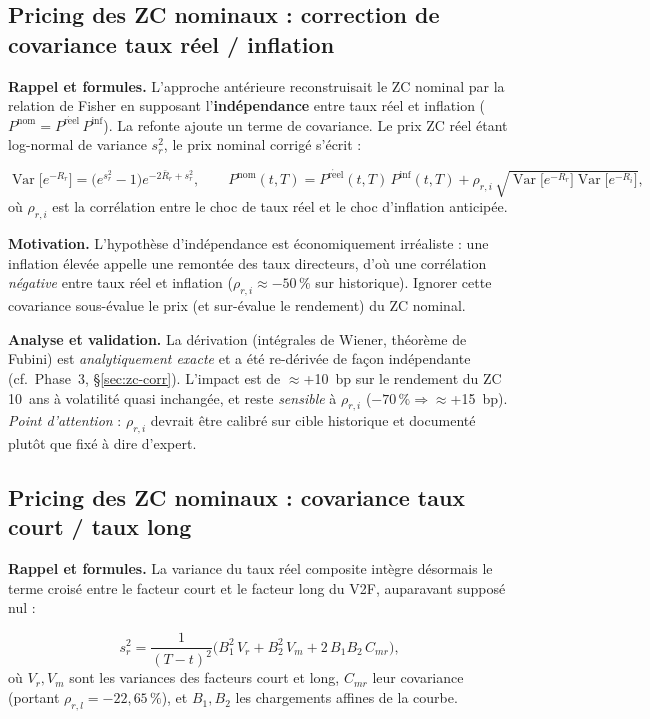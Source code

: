 \documentclass[11pt,a4paper]{article}
\begin{document}
\subsection{Pricing des ZC nominaux : correction de covariance taux réel / inflation}

\textbf{Rappel et formules.} L'approche antérieure reconstruisait le ZC nominal par la relation de Fisher en supposant l'\textbf{indépendance} entre taux réel et inflation ($P^{\mathrm{nom}}=P^{\mathrm{r\acute eel}}\,P^{\mathrm{inf}}$). La refonte ajoute un terme de covariance. Le prix ZC réel étant log-normal de variance $s_r^2$, le prix nominal corrigé s'écrit :
\begin{definitionbox}
\[
\operatorname{Var}\!\big[e^{-R_r}\big]=\big(e^{s_r^2}-1\big)e^{-2\bar R_r+s_r^2},\qquad
P^{\mathrm{nom}}(t,T)=P^{\mathrm{r\acute eel}}(t,T)\,P^{\mathrm{inf}}(t,T)+\rho_{r,i}\,\sqrt{\operatorname{Var}\!\big[e^{-R_r}\big]\operatorname{Var}\!\big[e^{-R_i}\big]},
\]
où $\rho_{r,i}$ est la corrélation entre le choc de taux réel et le choc d'inflation anticipée.
\end{definitionbox}

\textbf{Motivation.} L'hypothèse d'indépendance est économiquement irréaliste : une inflation élevée appelle une remontée des taux directeurs, d'où une corrélation \emph{négative} entre taux réel et inflation ($\rho_{r,i}\approx-50\,\%$ sur historique). Ignorer cette covariance sous-évalue le prix (et sur-évalue le rendement) du ZC nominal.

\textbf{Analyse et validation.} La dérivation (intégrales de Wiener, théorème de Fubini) est \emph{analytiquement exacte} et a été re-dérivée de façon indépendante (cf.\ Phase~3, \S\ref{sec:zc-corr}). L'impact est de $\approx$+10~bp sur le rendement du ZC 10~ans à volatilité quasi inchangée, et reste \emph{sensible} à $\rho_{r,i}$ ($-70\,\%\Rightarrow\approx$+15~bp). \emph{Point d'attention} : $\rho_{r,i}$ devrait être calibré sur cible historique et documenté plutôt que fixé à dire d'expert.

\subsection{Pricing des ZC nominaux : covariance taux court / taux long}

\textbf{Rappel et formules.} La variance du taux réel composite intègre désormais le terme croisé entre le facteur court et le facteur long du V2F, auparavant supposé nul :
\begin{definitionbox}
\[
s_r^2=\frac{1}{(T-t)^2}\Big(B_1^2\,V_r+B_2^2\,V_m+2\,B_1 B_2\,C_{mr}\Big),
\]
où $V_r,V_m$ sont les variances des facteurs court et long, $C_{mr}$ leur covariance (portant $\rho_{r,l}=-22{,}65\,\%$), et $B_1,B_2$ les chargements affines de la courbe.
\end{definitionbox}
\end{document}
